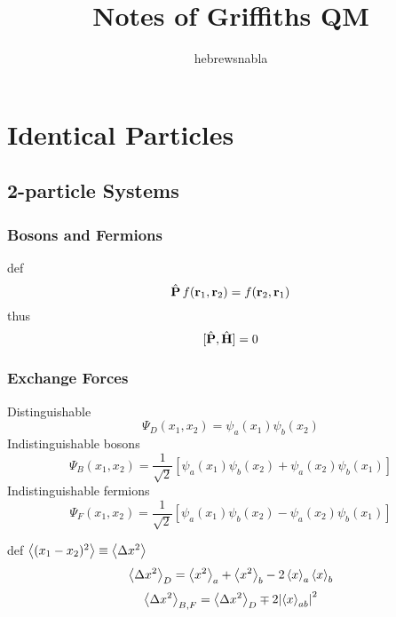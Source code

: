 \documentclass[UTF8]{ctexart} %
\title{Notes of Griffiths QM}
\author{hebrewsnabla}
\DeclareMathOperator{\hH}{\hat{\vb{H}}}
\DeclareMathOperator{\hP}{\hat{\vb{P}}}
\numberwithin{equation}{subsection}
\begin{document}
\maketitle

\tableofcontents

\newpage

\setcounter{section}{4}
\section{Identical Particles}
\subsection{2-particle Systems}
\subsubsection{Bosons and Fermions}
def
\begin{equation}\label{key}
\hP f(\vb{r}_1,\vb{r}_2) = f(\vb{r}_2,\vb{r}_1)
\end{equation}
thus
\begin{equation}\label{key}
[\hP, \hH] = 0
\end{equation}

\subsubsection{Exchange Forces}
Distinguishable
\begin{equation}\label{key}
\Psi_D(x_1,x_2) = \psi_a(x_1)\psi_b(x_2)
\end{equation}
Indistinguishable bosons
\begin{equation}\label{key}
\Psi_B(x_1,x_2) = \dfrac{1}{\sqrt{2}} [\psi_a(x_1)\psi_b(x_2) + \psi_a(x_2)\psi_b(x_1)]
\end{equation}
Indistinguishable fermions
\begin{equation}\label{key}
\Psi_F(x_1,x_2) = \dfrac{1}{\sqrt{2}} [\psi_a(x_1)\psi_b(x_2) - \psi_a(x_2)\psi_b(x_1)]
\end{equation}

def $ \ev{(x_1 - x_2)^2} \equiv \ev{\Delta x^2} $
\begin{equation}\label{key}
\ev{\Delta x^2}_D = \ev{x^2}_a + \ev{x^2}_b - 2\ev{x}_a\ev{x}_b
\end{equation}
\begin{equation}\label{key}
\ev{\Delta x^2}_{B,F} = \ev{\Delta x^2}_D \mp 2\abs{\ev{x}_{ab}}^2
\end{equation}
\end{document}
